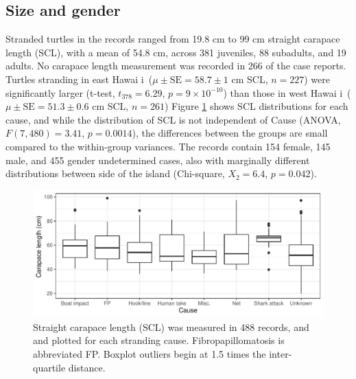 \documentclass[sn-basic,NameDate]{sn-jnl}\usepackage[]{graphicx}\usepackage[]{xcolor}
\makeatletter
\def\maxwidth{ %
  \ifdim\Gin@nat@width>\linewidth
    \linewidth
  \else
    \Gin@nat@width
  \fi
}
\newenvironment{knitrout}{}{} %
\DeclareRobustCommand{\okina}{%
  \raisebox{\dimexpr\fontcharht\font`A-\height}{%
    \scalebox{0.8}{`}%
  }%
}
\newcommand{\Hawaii}{Hawai\okina i}
\newcommand{\orig}[1]{{\color{red}(#1)}}
\makeatother
\begin{document}
\subsection{Size and gender}




Stranded turtles in the records ranged from 
19.8 cm to 
99 cm straight carapace length (SCL), with a mean of 
54.8 cm, across 
381 juveniles, 
88 subadults, and 
19 adults.
No carapace length measurement was recorded in 266 of the case reports.
Turtles stranding in east \Hawaii\ 
($\mu\pm\text{SE} = 58.7 
\pm 1$ cm SCL, $n=227$)
were significantly larger
(t-test, $t_{378}=6.29$,
$p=\ensuremath{9\times 10^{-10}}$)
than those in west \Hawaii\ 
($\mu\pm\text{SE} = 51.3 
\pm 0.6$ cm SCL, $n=261$)
Figure \ref{fig:length_cause} shows SCL distributions for each cause, and while the distribution of SCL is not independent of Cause (ANOVA, 
$F(7, 480)=3.41$, 
$p=0.0014$), 
the differences between the groups are small compared to the within-group variances.
The records contain 
154 female, 
145 male, and 
455 gender undetermined cases, also with marginally different distributions between side of the island (Chi-square, 
$X_{2}=6.4$,
$p=0.042$). 


\begin{figure}[tbp]
\begin{knitrout}
\color{fgcolor}
\includegraphics[width=\maxwidth]{figure/Figure-5} 
\end{knitrout}
\caption{Straight carapace length (SCL) was measured in 488 records, and and plotted for each stranding cause. Fibropapillomatosis is abbreviated FP. Boxplot outliers begin at 1.5 times the inter-quartile distance.}\label{fig:length_cause}
\end{figure}
\end{document}

